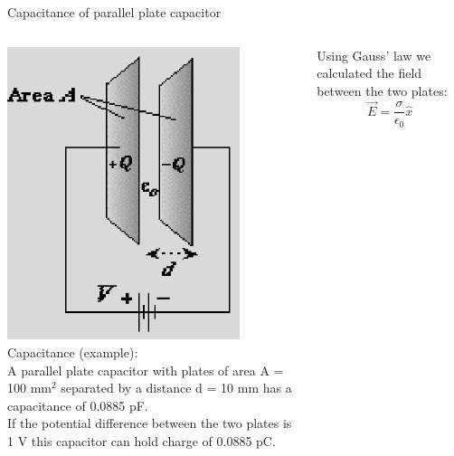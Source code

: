 %
%
%

\begin{frame}{Capacitance of parallel plate capacitor}

\begin{columns}
  \begin{column}{0.30\textwidth}
   \begin{center}
     \includegraphics[width=0.80\textwidth]{./images/schematics/parallel_plate_capacitor.png}\\
     \vspace{0.2cm}
     {\scriptsize
       Capacitance (example):\\
       A parallel plate capacitor with plates of area A = 100 mm$^2$ separated by a distance d = 10 mm
       has a capacitance of 0.0885 pF.\\
       If the potential difference between the two plates is 1 V
       this capacitor can hold charge of 0.0885 pC.\\
     }
   \end{center}
  \end{column}
  \begin{column}{0.70\textwidth}
     Using Gauss' law we calculated the field between the two plates:
     \begin{equation*}
         \vec{E} = \frac{\sigma}{\epsilon_0} \hat{x}

\end{equation*}
\end{column}
\end{columns}
\end{frame}
